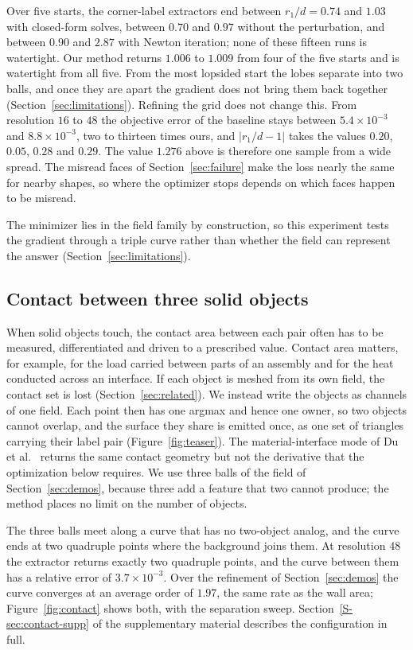 \documentclass{egpubl}
\newcommand{\sref}[1]{\ref*{S-#1}}
\newcommand{\supp}[1]{Section~\sref{#1} of the supplementary material}
\theoremstyle{definition}
\begin{document}
Over five starts, the corner-label extractors end between $r_1/d = 0.74$ and $1.03$
with closed-form solves, between $0.70$ and $0.97$ without the perturbation,
and between $0.90$ and $2.87$ with Newton iteration; none of these fifteen
runs is watertight. Our method returns $1.006$ to $1.009$ from four of the
five starts and is watertight from all five. From the most lopsided start the
lobes separate into two balls, and once they are apart the gradient does not
bring them back together (Section~\ref{sec:limitations}). Refining the grid
does not change this. From resolution $16$ to $48$ the objective error of the baseline stays between $5.4\times10^{-3}$ and
$8.8\times10^{-3}$, two to thirteen times ours, and $|r_1/d - 1|$ takes the
values $0.20$, $0.05$, $0.28$ and $0.29$. The value $1.276$ above is therefore one sample from a wide
spread. The misread faces of Section~\ref{sec:failure} make the
loss nearly the same for nearby shapes, so where the optimizer stops depends
on which faces happen to be misread.

The minimizer lies in the field family by construction, so this experiment
tests the gradient through a triple curve rather than whether the field can
represent the answer (Section~\ref{sec:limitations}).

\subsection{Contact between three solid objects}
\label{sec:contact}

When solid objects touch, the contact area between each pair often has to be
measured, differentiated and driven to a prescribed value. Contact area
matters, for example, for the load carried between parts of an assembly and
for the heat conducted across an interface. If each object is meshed from its
own field, the contact set is lost (Section~\ref{sec:related}). We instead
write the objects as channels of one field. Each point then has one argmax
and hence one owner, so two objects cannot overlap, and the surface they
share is emitted once, as one set of triangles carrying their label pair
(Figure~\ref{fig:teaser}). The material-interface mode of Du
et al.~\cite{du2022} returns the same contact geometry but not the derivative
that the optimization below requires. We use three balls of the field of
Section~\ref{sec:demos}, because three add a feature that two cannot produce;
the method places no limit on the number of objects.

The three balls meet along a curve that has no two-object
analog, and the curve ends at two quadruple points where the background joins
them. At resolution $48$ the extractor returns exactly two quadruple points,
and the curve between them has a relative error of $3.7\times10^{-3}$. Over
the refinement of Section~\ref{sec:demos} the curve converges at an average
order of $1.97$, the same rate as the wall area; Figure~\ref{fig:contact}
shows both, with the separation sweep.
\supp{sec:contact-supp} describes the configuration in full.
\end{document}
